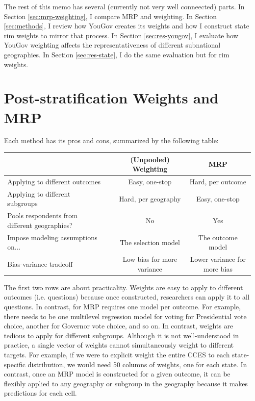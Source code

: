 \documentclass[11pt]{article}
\begin{document}
The rest of this memo has several (currently not very well conneected) parts. In Section \ref{sec:mrp-weighting}, I compare MRP and weighting. In Section \ref{sec:methods}, I review how YouGov creates its weights and how I construct state rim weights to mirror that process. In Section \ref{sec:res-yougov}, I evaluate how YouGov weighting affects the representativeness of different subnational geographies. In Section \ref{sec:res-state}, I do the same evaluation but for rim weights. 


\section{Post-stratification Weights and MRP \label{sec:mrp-weighting}}

Each method has its pros and cons, summarized by the following table:

\begin{table}[!h]
\centering
\small
\begin{tabularx}{0.97\linewidth}{p{7cm}lCC}
\toprule
&~& (Unpooled) Weighting & MRP \\\midrule
Applying to different outcomes & & Easy, one-stop & Hard, per outcome\\
Applying to different subgroups & & Hard, per geography & Easy, one-stop\\
Pools respondents from different geographies? & & No & Yes\\
Impose modeling assumptions on... & & The selection model & The outcome model \\
Bias-variance tradeoff & & {Low bias for more variance} & {Lower variance for more bias}\\
\bottomrule
\end{tabularx}
\end{table}

The first two rows are about practicality. Weights are easy to apply to different outcomes (i.e. questions) because once constructed, researchers can apply it to all questions. In contrast, for MRP requires one model per outcome. For example, there needs to be one multilevel regression model for voting for Presidential vote choice, another for Governor vote choice, and so on. In contrast, weights are tedious to apply for different subgroups. Although it is not well-understood in practice, a single vector of weights cannot simultaneously weight to different targets. For example, if we were to explicit weight the entire CCES to each state-specific distribution, we would need 50 columns of weights, one for each state. In contrast, once an MRP model is constructed for a given outcome, it can be flexibly applied to any geography or subgroup in the geography because it makes predictions for each cell. 
\end{document}
